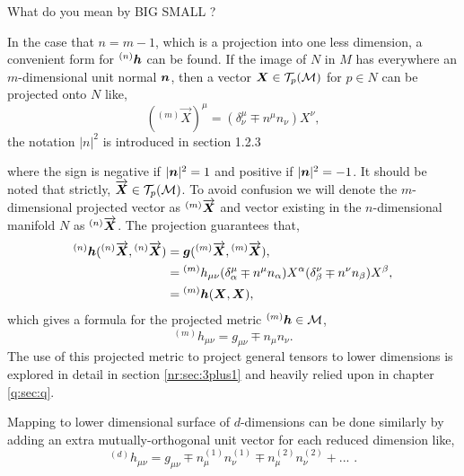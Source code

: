 \color{choral} What do you mean by BIG SMALL ? \color{black}

In the case that $n=m-1$, which is a projection into one less dimension, a convenient form for ${}^{(n)}\boldsymbol{h}$ can be found. If the image of $N$ in $M$ has everywhere an $m$-dimensional unit normal $\boldsymbol{n}$, then a vector $\boldsymbol{X}\in \mathcal{T}_p(\mathcal{M})$ for $p\in N$ can be projected onto $N$ like,
\begin{equation}
({}^{(m)}\overrightarrow{{X}})^\mu = (\delta^\mu_\nu \mp n^\mu n_\nu )X^\nu,
\end{equation}
\color{choral} the notation $|n|^2$ is introduced in section 1.2.3 \color{black}

where the sign is negative if $|\boldsymbol{n}|^2=1$ and positive if $|\boldsymbol{n}|^2 = -1$. It should be noted that strictly, $\overrightarrow{\boldsymbol{X}} \in \mathcal{T}_p(\mathcal{M})$. To avoid confusion we will denote the $m$-dimensional projected vector as ${}^{(m)}\overrightarrow{\boldsymbol{X}}$ and vector existing in the $n$-dimensional manifold $N$ as ${}^{(n)}\overrightarrow{\boldsymbol{X}}$. The projection guarantees that,
\begin{align}
{}^{(n)}\boldsymbol{h} ({}^{(n)}\overrightarrow{\boldsymbol{X}},{}^{(n)}\overrightarrow{\boldsymbol{X}}  ) &= \boldsymbol{g} ({}^{(m)}\overrightarrow{\boldsymbol{X}},{}^{(m)}\overrightarrow{\boldsymbol{X}}  ),\\
&= {}^{(m)}{h}_{\mu\nu} (\delta^\mu_\alpha \mp n^\mu n_\alpha) {{X}}^\alpha(\delta^\nu_\beta \mp n^\nu n_\beta) {{X}}^\beta  ,\\
&= {}^{(m)}\boldsymbol{h} ({\boldsymbol{X}},{\boldsymbol{X}}  ),
\end{align}
which gives a formula for the projected metric ${}^{(m)}\boldsymbol{h} \in \mathcal{M}$,
\begin{equation}
{}^{(m)}h_{\mu\nu} = g_{\mu\nu} \mp n_\mu n_\nu.
\end{equation}
The use of this projected metric to project general tensors to lower dimensions is explored in detail in section \ref{nr:sec:3plus1} and heavily relied upon in chapter \ref{q:sec:q}.

Mapping to lower dimensional surface of $d$-dimensions can be done similarly by adding an extra mutually-orthogonal unit vector for each reduced dimension like,
\begin{equation}
{}^{(d)}h_{\mu\nu} = g_{\mu\nu} \mp n^{(1)}_\mu n^{(1)}_\nu  \mp n^{(2)}_\mu n^{(2)}_\nu + ... \,\,.
\end{equation}

